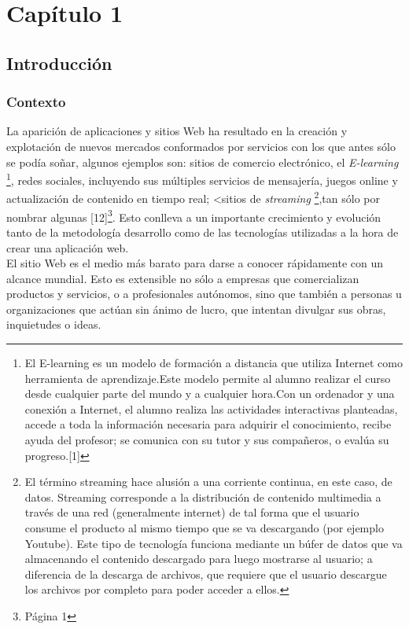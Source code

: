 \chapter{Capítulo 1}
\section{Introducción}

\subsection{Contexto}

La aparición de aplicaciones y sitios Web ha resultado en la creación y explotación de nuevos 
mercados conformados por servicios con los que antes sólo se podía soñar, algunos ejemplos son: sitios de 
comercio electrónico, el \textit{E-learning} \footnote{El E-learning es un modelo de formación a distancia 
que utiliza Internet como herramienta de aprendizaje.Este modelo permite al alumno realizar el curso desde 
cualquier parte del mundo y a cualquier hora.Con un ordenador y una conexión a Internet, el alumno realiza 
las actividades interactivas planteadas, accede a toda la información necesaria para adquirir el conocimiento, 
recibe ayuda del profesor; se comunica con su tutor y sus compañeros, o evalúa su progreso.[1]}, redes sociales, 
incluyendo sus múltiples servicios de mensajería, juegos online y actualización de contenido en tiempo real; 
<sitios de \textit{streaming} \footnote{El término streaming hace alusión a una corriente continua, en este caso, de datos.
Streaming corresponde a  la distribución de contenido multimedia a través de una red (generalmente internet)
de tal forma que el usuario consume el producto al mismo tiempo que se va descargando (por ejemplo Youtube). 
Este tipo de tecnología funciona mediante un búfer de datos que va almacenando el contenido descargado para 
luego mostrarse al usuario; a diferencia de la descarga de archivos, que requiere que el usuario descargue los 
archivos por completo para poder acceder a ellos.},tan sólo por nombrar algunas [12]\footnote{Página 1}. Esto 
conlleva a un importante crecimiento y evolución tanto de la metodología desarrollo como de las tecnologías 
utilizadas a la hora de crear una aplicación web.\\


El sitio Web es el medio más barato para darse a conocer rápidamente con un alcance mundial. 
Esto es extensible no sólo a empresas que comercializan productos y servicios, o a profesionales 
autónomos, sino que también a personas u organizaciones que actúan sin ánimo de lucro, que intentan
divulgar sus obras, inquietudes o ideas.\\

